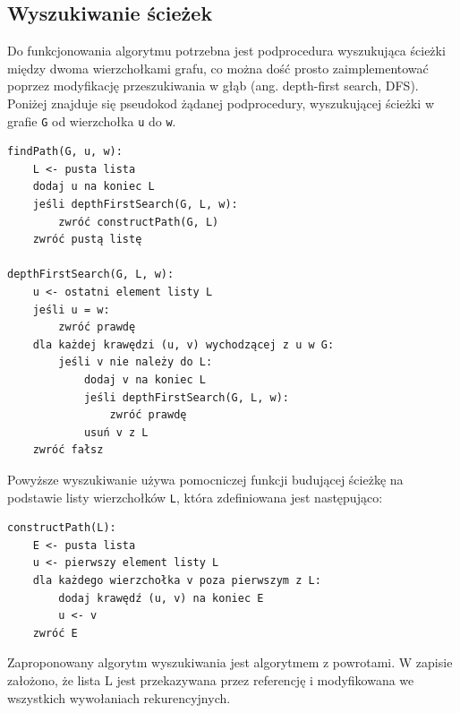 \documentclass[12pt,a4paper]{article}
\theoremstyle{definition}
\begin{document}
\subsection{Wyszukiwanie ścieżek}
Do funkcjonowania algorytmu potrzebna jest podprocedura wyszukująca ścieżki między dwoma wierzchołkami grafu, co można dość prosto zaimplementować poprzez modyfikację przeszukiwania w głąb (ang. depth-first search, DFS). Poniżej znajduje się pseudokod żądanej podprocedury, wyszukującej ścieżki w grafie \texttt{G} od wierzchołka \texttt{u} do \texttt{w}.\\

\begin{tcolorbox}[title=Wyszukiwanie ścieżek w grafie]
\begin{verbatim}
findPath(G, u, w):
    L <- pusta lista
    dodaj u na koniec L
    jeśli depthFirstSearch(G, L, w):
        zwróć constructPath(G, L)
    zwróć pustą listę

depthFirstSearch(G, L, w):
    u <- ostatni element listy L
    jeśli u = w:
        zwróć prawdę
    dla każdej krawędzi (u, v) wychodzącej z u w G:
        jeśli v nie należy do L:
            dodaj v na koniec L
            jeśli depthFirstSearch(G, L, w):
                zwróć prawdę
            usuń v z L
    zwróć fałsz
\end{verbatim}
\end{tcolorbox}

\vspace{0.5em}
\noindent
Powyższe wyszukiwanie używa pomocniczej funkcji budującej ścieżkę na podstawie listy wierzchołków \texttt{L}, która zdefiniowana jest następująco:\\

\begin{tcolorbox}[title=Budowanie ścieżki na podstawie wierzchołków]
\begin{verbatim}
constructPath(L):
    E <- pusta lista
    u <- pierwszy element listy L
    dla każdego wierzchołka v poza pierwszym z L:
        dodaj krawędź (u, v) na koniec E
        u <- v
    zwróć E
\end{verbatim}
\end{tcolorbox}

\vspace{0.5em}
\noindent
Zaproponowany algorytm wyszukiwania jest algorytmem z powrotami. W zapisie założono, że lista L jest przekazywana przez referencję i modyfikowana we wszystkich wywołaniach rekurencyjnych.\\
\end{document}
